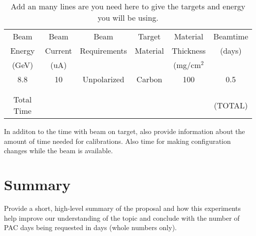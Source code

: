 \documentclass[titlepage,10pt]{article}
\begin{document}
\begin{table}[h!]
    \centering
\begin{tabular}{cccccc}
Beam   & Beam    & Beam         & Target   & Material   & Beamtime   \\
Energy & Current & Requirements & Material & Thickness  & (days) \\
(GeV)  & (uA)    &              &          & (mg/cm$^2$ &        \\
\hline
8.8    & 10      & Unpolarized  & Carbon   & 100        & 0.5    \\
       &         &              &          &            &        \\
       &         &              &          &            &        \\
\hline
Total Time &     &              &          &            & (TOTAL) \\
\end{tabular}
    \caption{Add an many lines are you need here to give the targets and energy you will be using.    }
    \label{tab:my_label}
\end{table}

In additon to the time with beam on target, also provide information about the amount of time needed for calibrations.    Also time for making configuration changes while the beam is available.

\section{Summary}

Provide a short, high-level summary of the proposal and how this experiments help improve our understanding of the topic and conclude with the number of PAC days being requested in days (whole numbers only).

%
%
%


%
%
%
%


\end{document}
